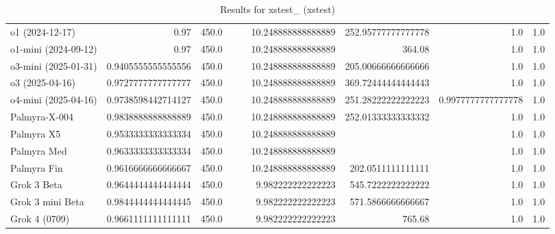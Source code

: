 \begin{table}[htp]
{\begin{tabular}{lrrrrrrrr}
o1 (2024-12-17) & 0.97 & 450.0 &  &  & 10.248888888888889 & 252.95777777777778 & 1.0 & 1.0 \\
o1-mini (2024-09-12) & 0.97 & 450.0 &  &  & 10.248888888888889 & 364.08 & 1.0 & 1.0 \\
o3-mini (2025-01-31) & 0.9405555555555556 & 450.0 &  &  & 10.248888888888889 & 205.00666666666666 & 1.0 & 1.0 \\
o3 (2025-04-16) & 0.9727777777777777 & 450.0 &  &  & 10.248888888888889 & 369.72444444444443 & 1.0 & 1.0 \\
o4-mini (2025-04-16) & 0.9738598442714127 & 450.0 &  &  & 10.248888888888889 & 251.28222222222223 & 0.9977777777777778 & 1.0 \\
Palmyra-X-004 & 0.9838888888888889 & 450.0 &  &  & 10.248888888888889 & 252.01333333333332 & 1.0 & 1.0 \\
Palmyra X5 & 0.9533333333333334 & 450.0 &  &  & 10.248888888888889 &  & 1.0 & 1.0 \\
Palmyra Med & 0.9633333333333334 & 450.0 &  &  & 10.248888888888889 &  & 1.0 & 1.0 \\
Palmyra Fin & 0.9616666666666667 & 450.0 &  &  & 10.248888888888889 & 202.0511111111111 & 1.0 & 1.0 \\
Grok 3 Beta & 0.9644444444444444 & 450.0 &  &  & 9.982222222222223 & 545.7222222222222 & 1.0 & 1.0 \\
Grok 3 mini Beta & 0.9844444444444445 & 450.0 &  &  & 9.982222222222223 & 571.5866666666667 & 1.0 & 1.0 \\
Grok 4 (0709) & 0.9661111111111111 & 450.0 &  &  & 9.982222222222223 & 765.68 & 1.0 & 1.0 \\
\bottomrule
\end{tabular}}
\caption{Results for xstest_ (xstest)}
\label{fig:xstest_ (xstest)}
\end{table}